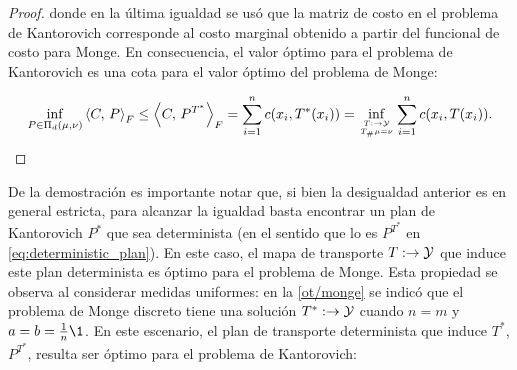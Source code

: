 \begin{proof}
	donde en la última igualdad se usó que la matriz de costo en el problema de Kantorovich corresponde al costo marginal obtenido a partir del funcional de costo para Monge. En consecuencia, el valor óptimo para el problema de Kantorovich es una cota para el valor óptimo del problema de Monge:

	\begin{equation*}
		\inf_{P\in \Pi_d(\mu,\nu)} \dotproduct{C}{P}_F
		\leq \dotproduct{C}{P^{T^*}}_F
		= \sum_{i=1}^{n} c(x_i, T^*(x_i))
		= \inf_{\feasible{T:\xspace\to\yspace}{T_\#\mu=\nu}} \sum_{i=1}^n c(x_i,T(x_i)).
	\end{equation*}
\end{proof}

De la demostración es importante notar que, si bien la desigualdad anterior es en general estricta, para alcanzar la igualdad basta encontrar un plan de Kantorovich $P^*$ que sea determinista (en el sentido que lo es $P^{T^*}$ en \eqref{eq:deterministic_plan}). En este caso, el mapa de transporte $T:\to\mathcal{Y}$ que induce este plan determinista es óptimo para el problema de Monge. Esta propiedad se observa al considerar medidas uniformes: en la \autoref{ot/monge} se indicó que el problema de Monge discreto tiene una solución $T^*:\to\mathcal{Y}$ cuando $n=m$ y $a=b=\frac{1}{n}\1$. En este escenario, el plan de transporte determinista que induce $T^*$, $P^{T^*}$, resulta ser óptimo para el problema de Kantorovich:


